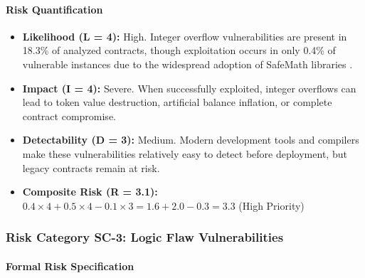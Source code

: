 \paragraph{Risk Quantification}

\begin{itemize}
\item \textbf{Likelihood (L = 4):} High. Integer overflow vulnerabilities are present in 18.3\% of analyzed contracts, though exploitation occurs in only 0.4\% of vulnerable instances due to the widespread adoption of SafeMath libraries \cite{perez2021analysis}.

\item \textbf{Impact (I = 4):} Severe. When successfully exploited, integer overflows can lead to token value destruction, artificial balance inflation, or complete contract compromise.

\item \textbf{Detectability (D = 3):} Medium. Modern development tools and compilers make these vulnerabilities relatively easy to detect before deployment, but legacy contracts remain at risk.

\item \textbf{Composite Risk (R = 3.1):} $0.4 \times 4 + 0.5 \times 4 - 0.1 \times 3 = 1.6 + 2.0 - 0.3 = 3.3$ (High Priority)
\end{itemize}

\subsubsection{Risk Category SC-3: Logic Flaw Vulnerabilities}

\paragraph{Formal Risk Specification}

